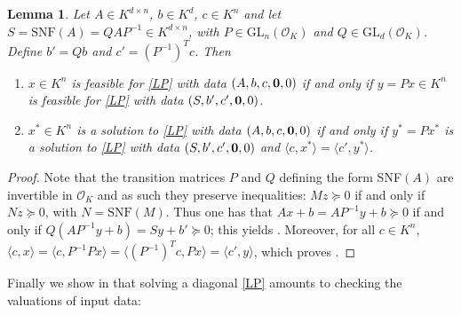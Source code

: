 \documentclass[sigconf]{acmart}
\newtheorem{lemma}[theorem]{Lemma}
\newcommand{\OK}{\mathcal{O}_K}
\newcommand{\GL}{\mathrm{GL}}
\begin{document}
\begin{lemma} \label{solsLP}
  Let $A \in K^{d\times n}$, $b \in K^d$, $c\in K^n$ and let
  $S = \mathrm{SNF}(A) = QAP^{-1} \in K^{d\times n}$, with
  $P \in \GL_n(\OK)$ and $Q\in \GL_d(\OK)$.
  Define $b' = Qb$ and $c' = (P^{-1})^Tc$.
  Then
   \begin{enumerate}
   \item \label{solsLP_item1}
     $x \in K^n$ is feasible for \eqref{LP} with data $(A,b,c,{\bf 0},0)$ if and only if $y = P x \in K^n$ is
     feasible for \eqref{LP} with data $(S,b',c',{\bf 0},0)$.
   \item \label{solsLP_item2}
     $x^* \in K^n$ is a solution to \eqref{LP} with data $(A,b,c,{\bf 0},0)$ if and only if $y^* = P x^*$ is
     a solution to \eqref{LP} with data $(S,b',c',{\bf 0},0)$ and $\langle c,x^* \rangle = \langle c',y^* \rangle$.
   \end{enumerate}
\end{lemma}
\begin{proof}
  Note that the transition matrices $P$ and $Q$ defining the form SNF$(A)$ are invertible in $\OK$
  and as such they preserve inequalities: $Mz \succeq 0$ if and only if $Nz \succeq 0$, with
  $N = \mathrm{SNF}(M)$. Thus one has that $Ax+b = AP^{-1}y +b \succeq 0$ if and only if
  $Q(AP^{-1}y + b) = Sy + b' \succeq 0$; this yields .
  Moreover, for all $c \in K^n$, $\langle c, x\rangle = \langle c, P^{-1}Px \rangle =
  \langle (P^{-1})^T c, Px \rangle = \langle c',y\rangle$, which proves
  .
\end{proof}

Finally we show in  that solving a diagonal \eqref{LP} amounts
to checking the valuations of input data:
\end{document}
